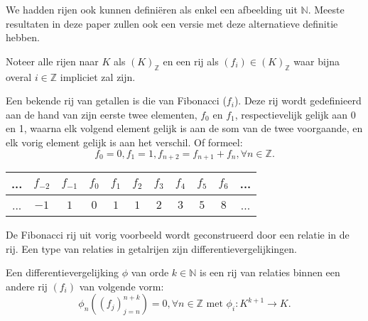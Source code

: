 \documentclass[a4paper,12pt]{article}
\begin{document}
\begin{remark}
    We hadden rijen ook kunnen definiëren als enkel een afbeelding uit $\mathbb{N}$. Meeste resultaten in deze
    paper zullen ook een versie met deze alternatieve definitie hebben.
\end{remark}

\begin{notation}[rij]
    Noteer alle rijen naar $K$ als $(K)_{\mathbb{Z}}$ en
    een rij als $(f_i) \in (K)_{\mathbb{Z}}$ waar bijna overal $i \in \mathbb{Z}$ impliciet zal zijn.
\end{notation}



\begin{example} %
    Een bekende rij van getallen is die van Fibonacci ($f_i$). Deze rij wordt gedefinieerd aan de hand
    van zijn eerste twee elementen, $f_0$ en $f_1$, respectievelijk gelijk aan 0 en 1, waarna elk volgend element gelijk
    is aan de som van de twee voorgaande, en elk vorig element gelijk is aan het verschil. Of formeel:
    $$
        f_0 = 0, f_1 = 1, f_{n+2} = f_{n+1}+f_{n}, \forall n \in \mathbb{Z}.
    $$

    \begin{table}[ht]
        \centering
        \begin{tabular}{|c|c|c|c|c|c|c|c|c|c|c|} \hline
            ... & $f_{-2}$ & $f_{-1}$ & $f_0$ & $f_1$ & $f_2$ & $f_3$ & $f_4$ & $f_5$ & $f_6$ & ... \\ \hline
            ... & $-1$     & $1$      & $0$   & $1$   & $1$   & $2$   & $3$   & $5$   & $8$   & ... \\ \hline
        \end{tabular}
    \end{table}
\end{example}

De Fibonacci rij uit vorig voorbeeld wordt geconstrueerd door een relatie in de rij. Een type van
relaties in getalrijen zijn differentievergelijkingen.

\begin{definition}[differentievergelijking]
    Een differentievergelijking $\phi$ van orde $k \in \mathbb{N}$ is een rij van relaties binnen een andere rij $(f_i)$
    van volgende vorm:
    $$
        \phi_n((f_j)_{j = n}^{n+k}) = 0, \forall n \in \mathbb{Z}  \text{ met } \phi_i:K^{k+1} \rightarrow K.
    $$
\end{definition}
\end{document}
